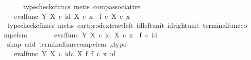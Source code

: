 \begin{isabellebody}
\ \ \ \ \isamarkupfalse%
\ {\isacharparenleft}{\kern0pt}typecheck{\isacharunderscore}{\kern0pt}cfuncs{\isacharcomma}{\kern0pt}\ metis\ comp{\isacharunderscore}{\kern0pt}associative{}{\isacharparenright}{\kern0pt}\isanewline
\ \ \isamarkupfalse%
\ \isamarkupfalse%
\ {\isachardoublequoteopen}{\isachardot}{\kern0pt}{\isachardot}{\kern0pt}{\isachardot}{\kern0pt}\ {\isacharequal}{\kern0pt}\ eval{\isacharunderscore}{\kern0pt}func\ Y\ X\ {\isasymcirc}\isactrlsub c\ {\isasymlangle}id\ X\ {\isasymcirc}\isactrlsub c\ x\ {\isacharcomma}{\kern0pt}\ f\ {\isasymcirc}\isactrlsub c\ {\isacharparenleft}{\kern0pt}{\isasymbeta}\isactrlbsub X\isactrlesub \ {\isasymcirc}\isactrlsub c\ x{\isacharparenright}{\kern0pt}{\isasymrangle}{\isachardoublequoteclose}\isanewline
\ \ \ \ \isamarkupfalse%
\ {\isacharparenleft}{\kern0pt}typecheck{\isacharunderscore}{\kern0pt}cfuncs{\isacharcomma}{\kern0pt}\ metis\ cart{\isacharunderscore}{\kern0pt}prod{\isacharunderscore}{\kern0pt}extract{\isacharunderscore}{\kern0pt}left\ id{\isacharunderscore}{\kern0pt}left{\isacharunderscore}{\kern0pt}unit{}\ id{\isacharunderscore}{\kern0pt}right{\isacharunderscore}{\kern0pt}unit{}\ terminal{\isacharunderscore}{\kern0pt}func{\isacharunderscore}{\kern0pt}comp{\isacharunderscore}{\kern0pt}elem{\isacharparenright}{\kern0pt}\isanewline
\ \ \isamarkupfalse%
\ \isamarkupfalse%
\ {\isachardoublequoteopen}{\isachardot}{\kern0pt}{\isachardot}{\kern0pt}{\isachardot}{\kern0pt}\ {\isacharequal}{\kern0pt}\ eval{\isacharunderscore}{\kern0pt}func\ Y\ X\ {\isasymcirc}\isactrlsub c\ {\isasymlangle}id\ X\ {\isasymcirc}\isactrlsub c\ x\ {\isacharcomma}{\kern0pt}\ f\ {\isasymcirc}\isactrlsub c\ id\ {\isasymone}{\isasymrangle}{\isachardoublequoteclose}\isanewline
\ \ \ \ \isamarkupfalse%
\ {\isacharparenleft}{\kern0pt}simp\ add{\isacharcolon}{\kern0pt}\ terminal{\isacharunderscore}{\kern0pt}func{\isacharunderscore}{\kern0pt}comp{\isacharunderscore}{\kern0pt}elem\ x{\isacharunderscore}{\kern0pt}type{\isacharparenright}{\kern0pt}\isanewline
\ \ \isamarkupfalse%
\ \isamarkupfalse%
\ {\isachardoublequoteopen}{\isachardot}{\kern0pt}{\isachardot}{\kern0pt}{\isachardot}{\kern0pt}\ {\isacharequal}{\kern0pt}\ eval{\isacharunderscore}{\kern0pt}func\ Y\ X\ {\isasymcirc}\isactrlsub c\ {\isacharparenleft}{\kern0pt}id\isactrlsub c\ X\ {\isasymtimes}\isactrlsub f\ f{\isacharparenright}{\kern0pt}\ {\isasymcirc}\isactrlsub c\ {\isasymlangle}x{\isacharcomma}{\kern0pt}\ id\ {\isasymone}{\isasymrangle}{\isachardoublequoteclose}\isanewline

\end{isabellebody}
